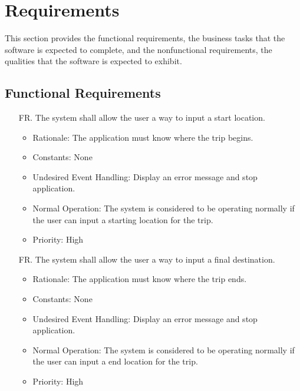 \documentclass[12pt]{article}
\newcounter{reqnum} %
\begin{document}
\newpage
\section{Requirements}

This section provides the functional requirements, the business tasks that the
software is expected to complete, and the nonfunctional requirements, the
qualities that the software is expected to exhibit.

\subsection{Functional Requirements}

\noindent \begin{itemize}

\item[FR\refstepcounter{reqnum}\thereqnum. ] The system shall allow the user a way to input a start location.
\begin{itemize}
    \item Rationale: The application must know where the trip begins.
    \item Constants: None
    \item Undesired Event Handling: Display an error message and stop application.
    \item Normal Operation: The system is considered to be operating normally if the user can input a starting location for the trip.
	\item Priority: High
\end{itemize}

\item[FR\refstepcounter{reqnum}\thereqnum. ] The system shall allow the user a way to input a final destination.
\begin{itemize}
    \item Rationale: The application must know where the trip ends.
    \item Constants: None
    \item Undesired Event Handling: Display an error message and stop application.
    \item Normal Operation: The system is considered to be operating normally if the user can input a end location for the trip.
	\item Priority: High
\end{itemize}


\end{itemize}
\end{document}
